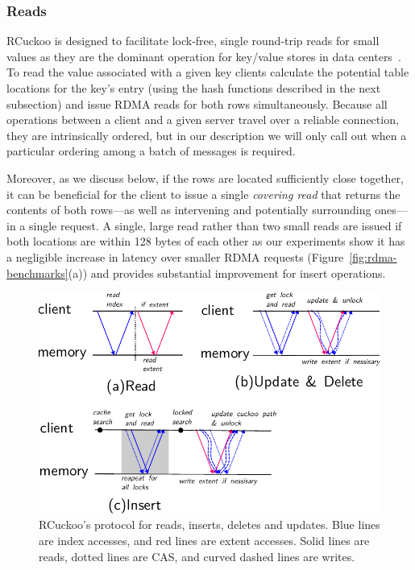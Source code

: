 \subsubsection{Reads} 
\label{sec:reading}


RCuckoo is designed to facilitate lock-free, single round-trip reads
for small values as they are the dominant operation for key/value
stores in data centers~\cite{facebook-memcached,rocks-db-workload}. To
read the value associated with a given key clients calculate the
potential table locations for the key's entry (using the hash
functions described in the next subsection) and issue RDMA reads for
both rows simultaneously.  Because all operations between a client and
a given server travel over a reliable connection, they are
intrinsically ordered, but in our description we will only call out
when a particular ordering among a batch of messages is required.


Moreover, as we discuss below, if the rows are
located sufficiently close together, it can be beneficial for the
client to issue a single \emph{covering read} that returns the
contents of both rows---as well as intervening and potentially
surrounding ones---in a single request.
A single, large read rather than two small reads are issued
if both locations are within
128 bytes of each other as our experiments show it has a negligible
increase in latency over smaller RDMA requests
(Figure~\ref{fig:rdma-benchmarks}(a)) and provides substantial
improvement for insert operations.


\begin{figure}[t]
\includegraphics[width=0.99\linewidth]{fig/message_diagram.pdf}
\caption{RCuckoo's protocol for reads, inserts, deletes and
updates. Blue lines are index accesses, and red lines are
extent accesses. Solid lines are reads, dotted lines are
CAS, and curved dashed lines are writes.}
\label{fig:message_diagram}
\end{figure}


